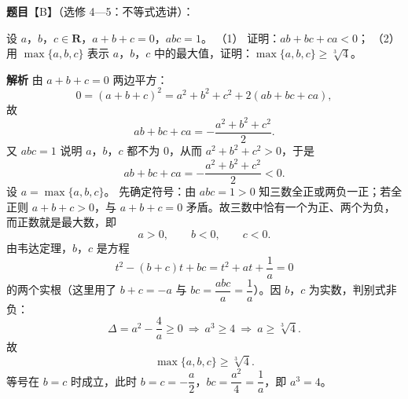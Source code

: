 \begin{answer}

\textbf{题目}【B】（选修 4—5：不等式选讲）：

设 $a$，$b$，$c\in\mathbf R$，$a+b+c=0$，$abc=1$。
（1） 证明：$ab+bc+ca<0$；
（2） 用 $\max\{a,b,c\}$ 表示 $a$，$b$，$c$ 中的最大值，证明：$\max\{a,b,c\}\geqslant\sqrt[3]{4}$。

\textbf{解析}
由 $a+b+c=0$ 两边平方：
\nopagebreak[4]
\[0=(a+b+c)^2=a^2+b^2+c^2+2(ab+bc+ca),\]
故
\nopagebreak[4]
\[ab+bc+ca=-\frac{a^2+b^2+c^2}2 .\]
又 $abc=1$ 说明 $a$，$b$，$c$ 都不为 $0$，从而 $a^2+b^2+c^2>0$，于是
\nopagebreak[4]
\[ab+bc+ca=-\frac{a^2+b^2+c^2}2<0 .\]
设 $a=\max\{a,b,c\}$。
先确定符号：由 $abc=1>0$ 知三数全正或两负一正；若全正则 $a+b+c>0$，与 $a+b+c=0$ 矛盾。故三数中恰有一个为正、两个为负，而正数就是最大数，即
\nopagebreak[4]
\[a>0,\qquad b<0,\qquad c<0 .\]
由韦达定理，$b$，$c$ 是方程
\nopagebreak[4]
\[t^2-(b+c)t+bc=t^2+at+\frac1a=0\]
的两个实根（这里用了 $b+c=-a$ 与 $bc=\dfrac{abc}a=\dfrac1a$）。因 $b$，$c$ 为实数，判别式非负：
\nopagebreak[4]
\[\Delta=a^2-\frac4a\geqslant0\ \Longrightarrow\ a^3\geqslant4\ \Longrightarrow\ a\geqslant\sqrt[3]{4} .\]
故
\nopagebreak[4]
\[\max\{a,b,c\}\geqslant\sqrt[3]{4} .\]
等号在 $b=c$ 时成立，此时 $b=c=-\dfrac a2$，$bc=\dfrac{a^2}4=\dfrac1a$，即 $a^3=4$。



\end{answer}